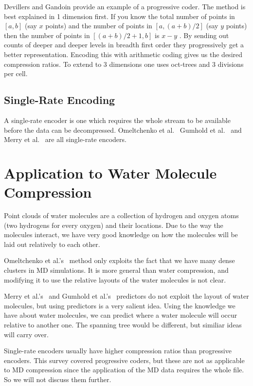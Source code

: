\documentclass[11pt,twocolumn]{article}
\begin{document}
Devillers and Gandoin \cite{devillers2000gci} provide an example of a
progressive coder. The method is best explained in 1 dimension first. If you
know the total number of points in $[a, b]$ (say $x$ points) and the number of
points in $[a, (a+b)/2]$ (say $y$ points) then the number of points in
$[(a+b)/2+1, b]$ is $x - y$ . By sending out counts of deeper and deeper
levels in breadth first order they progressively get a better
representation. Encoding this with arithmetic coding gives us the desired
compression ratios. To extend to 3 dimensions one uses oct-trees and 3
divisions per cell.


\subsection{Single-Rate Encoding}

A single-rate encoder is one which requires the whole stream to be available
before the data can be decompressed. Omeltchenko et
al.~\cite{omeltchenko2000sls} Gumhold et al.~\cite{gumholdcomp} and Merry et
al.~\cite{merrycomp} are all single-rate encoders.


\section{Application to Water Molecule Compression}

Point clouds of water molecules are a collection of hydrogen and oxygen atoms
(two hydrogens for every oxygen) and their locations. Due to the way the
molecules interact, we have very good knowledge on how the molecules will be
laid out relatively to each other.

Omeltchenko et al.'s~\cite{omeltchenko2000sls} method only exploits the fact
that we have many dense clusters in MD simulations. It is more general than
water compression, and modifying it to use the relative layouts of the water
molecules is not clear.

Merry et al.'s~\cite{merrycomp} and Gumhold et al.'s~\cite{gumholdcomp}
predictors do not exploit the layout of water molecules, but using predictors
is a very salient idea. Using the knowledge we have about water molecules, we
can predict where a water molecule will occur relative to another one. The
spanning tree would be different, but similiar ideas will carry over.

Single-rate encoders usually have higher compression ratios than progressive
encoders. This survey covered progressive coders, but these are not as
applicable to MD compression since the application of the MD data requires the
whole file. So we will not discuss them further.
\end{document}
